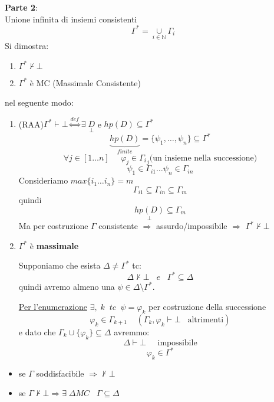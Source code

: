 \documentclass{article}
\theoremstyle{break}
\theoremstyle{break}
\theoremstyle{break}
\theoremstyle{break}
\begin{document}
\textbf{Parte 2}:\\
Unione infinita di insiemi consistenti
\[
  \Gamma^* = \underset{i \in \mathbb{N}}{\cup } \Gamma_i
\] 
Si dimostra:
\begin{enumerate}
  \item \( \Gamma^* \not\vdash \bot \) 
  \item \( \Gamma^* \) è MC (Massimale Consistente) 
\end{enumerate}
nel seguente modo:
\begin{enumerate}
  \item (RAA)\( \Gamma^* \vdash \bot \stackrel{def}{\Leftrightarrow} \exists \; \underset{\bot}{D} \) e \( hp(D) \subseteq \Gamma^* \) 
    \[
      \underbrace{hp(D)}_{finite} = \{\psi_1, \ldots, \psi_n\} \subseteq \Gamma^* 
    \] 
    \[
      \forall j \in [1 \ldots n]\;\;\;\;\;\varphi_j \in {\Gamma_i}_j \text{(un insieme nella successione)}
    \] 
    \[
      \psi_1 \in  \Gamma_{i1} \ldots \psi_n \in \Gamma_{in}
    \] 
    Consideriamo \( max \{i_1 \ldots i_n\} = m  \) 
    \[
      \Gamma_{i1} \subseteq \Gamma_{in} \subseteq \Gamma_m
    \] 
    quindi
    \[
      \underset{\bot}{hp(D)} \subseteq \Gamma_{m}
    \] 
    Ma per costruzione \( \Gamma \) consistente \( \Rightarrow \) assurdo/impossibile \( \Rightarrow \) \( \Gamma^* \not\vdash \bot \) 
  \item \( \Gamma^* \) è \textbf{massimale}

    Supponiamo che esista \( \Delta \neq \Gamma^* \) tc:
    \[
      \Delta \not\vdash \bot\;\;\;e\;\;\; \Gamma^* \subseteq \Delta
    \] 
    quindi avremo almeno una \( \psi \in \Delta \setminus \Gamma^* \).

    \underline{Per l'enumerazione} \( \exists,\;k \;\;tc\;\; \psi = \varphi_k \) per costruzione
    della successione
    \[
      \varphi_k \in \Gamma_{k+1} \;\;\;\; (\Gamma_k, \varphi_k \vdash \bot \;\;\; \text{altrimenti})
    \] 
    e dato che \( \Gamma_k \cup \{\varphi_k\} \subseteq \Delta\) avremmo:
    \[
      \Delta \vdash \bot\;\;\;\;\; \text{impossibile}
    \] 
    \[
      \varphi_k \in \Gamma^*
    \] 
\end{enumerate}
\begin{itemize}
  \item se \( \Gamma \) soddisfacibile \( \Rightarrow \not\vdash \bot \) 
  \item se \( \Gamma \not\vdash \bot \Rightarrow \exists \;\Delta MC\;\;\;\Gamma\subseteq \Delta\) 
\end{itemize}
\end{document}
